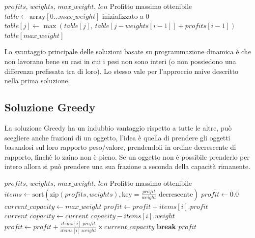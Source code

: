 \documentclass[11pt]{article}
\begin{document}
\begin{algorithm}[H]
\caption{Knapsack 0/1 Bottom-Up (spazio ottimizzato)}\label{alg:knapsack-opt}
\begin{algorithmic}
\Require $profits$, $weights$, $max\_weight$, $len$
\Ensure Profitto massimo ottenibile
\State $table \gets \text{array}[0 \dots max\_weight]$ inizializzato a 0
        \State $table[j] \gets \max(table[j],\ table[j - weights[i-1]] + profits[i-1])$
    \EndFor
\EndFor
\State \Return $table[max\_weight]$
\end{algorithmic}
\end{algorithm}

Lo svantaggio principale delle soluzioni basate su programmazione dinamica è che non lavorano bene su casi in cui i pesi non sono interi
(o non possiedono una differenza prefissata tra di loro). Lo stesso vale per l'approccio naive descritto nella prima soluzione.

\subsection{Soluzione Greedy}
La soluzione Greedy ha un indubbio vantaggio rispetto a tutte le altre, può scegliere anche frazioni di un oggetto, 
l'idea è quella di prendere gli oggetti basandosi sul loro rapporto peso/valore, prendendoli in ordine decrescente di rapporto,
finchè lo zaino non è pieno. Se un oggetto non è possibile prenderlo per intero allora si può prendere una sua frazione a seconda 
della capacità rimanente. 

\begin{algorithm}[H]
\caption{Fractional Knapsack (Greedy)}\label{alg:fknapsack}
\begin{algorithmic}
\Require $profits$, $weights$, $max\_weight$, $len$
\Ensure Profitto massimo ottenibile
\State $items \gets \text{sort}(\text{zip}(profits, weights), \text{key} = \frac{profit}{weight} \text{ decrescente})$
\State $profit \gets 0.0$
\State $current\_capacity \gets max\_weight$
        \State $profit \gets profit + items[i].profit$
        \State $current\_capacity \gets current\_capacity - items[i].weight$
    \Else
        \State $profit \gets profit + \frac{items[i].profit}{items[i].weight} \times current\_capacity$
        \State \textbf{break}
    \EndIf
\EndFor
\State \Return $profit$
\end{algorithmic}
\end{algorithm}
\end{document}
